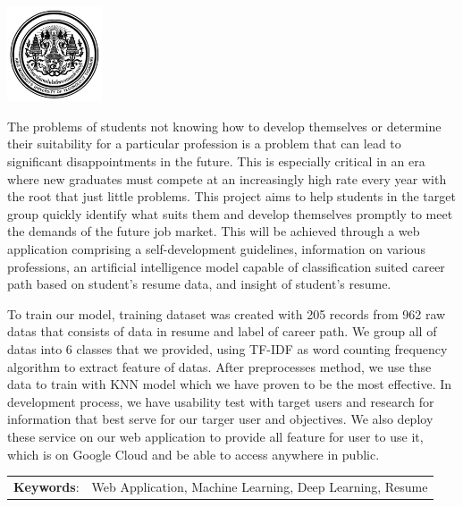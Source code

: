 \documentclass[12pt,oneside,openright,a4paper]{cpe-thai-project}
\begin{document}
\pdfstringdefDisableCommands{%
    \let\MakeUppercase\relax
}

\begin{center}
    \includegraphics[width=2.8cm]{logo02.jpg}
\end{center}
\vspace*{-1cm}

\maketitlepage
\makesignaturepage

\abstract

The problems of students not knowing how to develop themselves or determine their suitability for a particular profession
is a problem that can lead to significant disappointments in the future. This is especially critical in an era where new graduates
must compete at an increasingly high rate every year with the root that just little problems. This project aims to help students in
the target group quickly identify what suits them and develop themselves promptly to meet the demands of the future job market.
This will be achieved through a web application comprising a self-development guidelines, information on various professions,
an artificial intelligence model capable of classification suited career path based on student's resume data, and insight of student's resume.

To train our model, training dataset was created with 205 records from 962 raw datas that consists of data in resume and label of career path.
We group all of datas into 6 classes that we provided, using TF-IDF as word counting frequency algorithm to extract feature of datas.
After preprocesses method, we use thse data to train with KNN model which we have proven to be the most effective.
In development process, we have usability test with target users and research for information that best serve for our targer user and objectives.
We also deploy these service on our web application to provide all feature for user to use it, which is on Google Cloud and be able to access anywhere in public.


\begin{flushleft}
    \begin{tabular*}{\textwidth}{@{}lp{}}
        \textbf{Keywords}: & Web Application, Machine Learning, Deep Learning, Resume
    \end{tabular*}
\end{flushleft}
\endabstract
\end{document}
